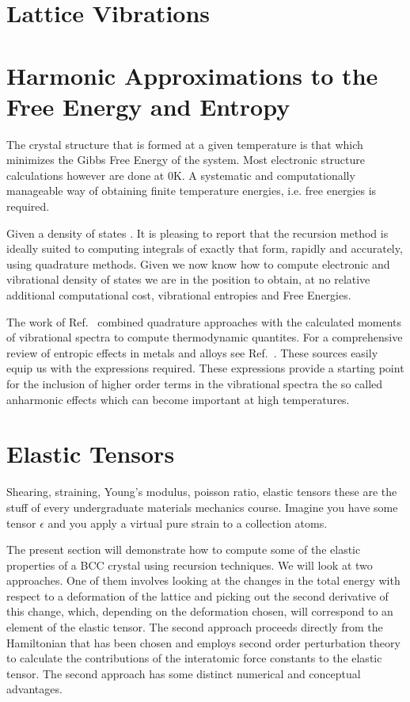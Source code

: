 \section{Lattice Vibrations}

\section{Harmonic Approximations to the Free Energy and Entropy}
The crystal structure that is formed at a given temperature is that which
minimizes the Gibbs Free Energy of the system. Most electronic structure calculations
however are done at 0K. A systematic and computationally manageable way of obtaining
finite temperature energies, i.e. free energies is required.

Given a density of states . It is pleasing to report that the recursion method
is ideally suited to computing integrals of exactly that form, rapidly and accurately,
using quadrature methods. Given we now know how to compute electronic and 
vibrational density of states we are in the position to obtain, at no relative additional 
computational cost, vibrational entropies and Free Energies.

The work of Ref.~\cite{wheeler68} combined quadrature approaches
with the calculated moments of vibrational spectra to compute
thermodynamic quantites. For a comprehensive review
of entropic effects in metals and alloys see Ref.~\cite{fultz10}. 
These sources easily equip us with the expressions required. These expressions provide a starting
point for the inclusion of higher order terms in the vibrational spectra
the so called anharmonic effects which can become important at high temperatures.

\section{Elastic Tensors}
Shearing, straining, Young's modulus, poisson ratio, elastic tensors these are the
stuff of every undergraduate materials mechanics course.
Imagine you have some tensor $\epsilon$ and you apply a virtual pure strain to a collection atoms.

The present section will demonstrate how to compute some of the elastic properties
of a BCC crystal using recursion techniques. We will look at two approaches.
One of them involves looking at the changes in the total energy with
respect to a deformation of the lattice and picking out the 
second derivative of this change, which, depending on the deformation chosen,
will correspond to an element of the elastic tensor. The second approach
proceeds directly from the Hamiltonian that has been chosen and employs second order
perturbation theory to calculate the contributions of
the interatomic force constants to the elastic tensor. 
The second approach has some distinct numerical 
and conceptual advantages.

